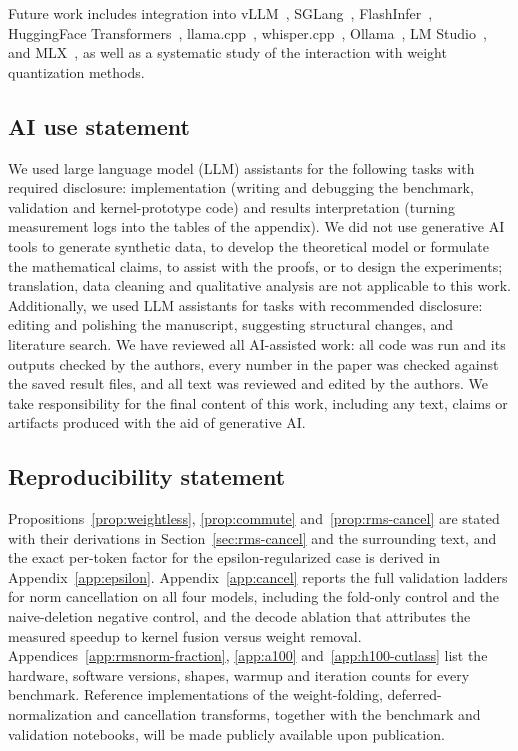 \documentclass{article}
\begin{document}
Future work includes integration into
vLLM~\citep{vLLM}, SGLang~\citep{sglang}, FlashInfer~\citep{flashInfer},
HuggingFace Transformers~\citep{HFtransformers},
llama.cpp~\citep{llama-cpp}, whisper.cpp~\citep{whisper-cpp},
Ollama~\citep{ollama}, LM Studio~\citep{lmstudio}, and MLX~\citep{mlx}, as well as a systematic
study of the interaction with weight quantization methods.


\subsection*{AI use statement}
We used large language model (LLM) assistants for the following tasks with
required disclosure: implementation (writing and debugging the benchmark,
validation and kernel-prototype code) and results interpretation (turning
measurement logs into the tables of the appendix). We did not use generative AI
tools to generate synthetic data, to develop the theoretical model or formulate
the mathematical claims, to assist with the proofs, or to design the experiments;
translation, data cleaning and qualitative analysis are not applicable to this
work. Additionally, we used LLM assistants for tasks with recommended disclosure:
editing and polishing the manuscript, suggesting structural changes, and
literature search. We have reviewed all AI-assisted work: all code was run and
its outputs checked by the authors, every number in the paper was checked against
the saved result files, and all text was reviewed and edited by the authors. We
take responsibility for the final content of this work, including any text, claims or
artifacts produced with the aid of generative AI.

\subsection*{Reproducibility statement}
Propositions~\ref{prop:weightless}, \ref{prop:commute} and~\ref{prop:rms-cancel}
are stated with their derivations in Section~\ref{sec:rms-cancel} and the
surrounding text, and the exact per-token factor for the epsilon-regularized case
is derived in Appendix~\ref{app:epsilon}. Appendix~\ref{app:cancel} reports the
full validation ladders for norm cancellation on all four models, including the
fold-only control and the naive-deletion negative control, and the decode
ablation that attributes the measured speedup to kernel fusion versus weight
removal. Appendices~\ref{app:rmsnorm-fraction}, \ref{app:a100}
and~\ref{app:h100-cutlass} list the hardware, software versions, shapes, warmup
and iteration counts for every benchmark. Reference implementations of the
weight-folding, deferred-normalization and cancellation transforms, together with
the benchmark and validation notebooks, will be made publicly available upon
publication.
\end{document}
